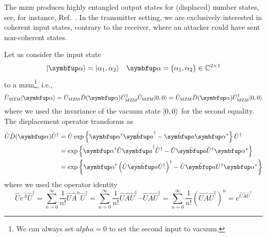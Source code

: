 The \gls{mzm} produces highly entangled output states for (displaced) number states, see, for instance, Ref.~\cite{Windhager2011}.
In the transmitter setting, we are exclusively interested in coherent input states, contrary to the receiver, where an attacker could have sent non-coherent states.

Let us consider the input state
\begin{align}
	\ket{\vb{\alpha}}
	&=
	\ket{\alpha_1,\alpha_2}
	&
	\vb{\alpha}
	=
	\begin{pmatrix}
		\alpha_1,
		\alpha_2
	\end{pmatrix}
	\in
	\mathbb{C}^{2\times1}
\end{align}
to a \gls{mzm}\footnote{We can always set $alpha=0$ to set the second input to vacuum.}, i.e.,
\begin{equation}
	\hat{U}_\text{MZM}
	\ket{\vb{\alpha}}
	=
	\hat{U}_\text{MZM}
	\hat{D}(\vb{\alpha})
	\hat{U}_\text{MZM}^\dagger
	\hat{U}_\text{MZM}
	\ket{0,0}
	=
	\hat{U}_\text{MZM}
	\hat{D}(\vb{\alpha})
	\hat{U}_\text{MZM}^\dagger
	\ket{0,0}
\end{equation}
where we used the invariance of the vacuum state $\lvert0,0\rangle$ for the second equality.
The displacement operator transforms as
\begin{equation}
	\begin{split}
		\hat{U}
		\hat{D}(\vb{\alpha})
		\hat{U}^\dagger
		&=
		\hat{U}
		\exp\left\{
			\vb{\alpha}^\trans
			\hat{\vb{a}}^\dagger
			-
			\hat{\vb{a}}
			\vb{\alpha}^*
		\right\}
		\hat{U}^\dagger
		\\
		&=
		\exp\left\{
			\vb{\alpha}^\trans
			\hat{U}
			\hat{\vb{a}}^\dagger
			\hat{U}^\dagger
			-
			\hat{U}
			\hat{\vb{a}}
			\hat{U}^\dagger
			\vb{\alpha}^*
		\right\}
		\\
		&=
		\exp\left\{
			\vb{\alpha}^\trans
			\left(
				\hat{U}
				\hat{\vb{a}}
				\hat{U}^\dagger
			\right)^\dagger
			-
			\hat{U}
			\hat{\vb{a}}
			\hat{U}^\dagger
			\vb{\alpha}^*
		\right\}
	\end{split}
\end{equation}
where we used the operator identity
\begin{equation}
	\hat{U}
	e^{\hat{A}}
	\hat{U}^\dagger
	=
	\sum_{n=0}^\infty
	\frac{1}{n!}
	\hat{U}
	\hat{A}^n
	\hat{U}^\dagger
	=
	\sum_{n=0}^\infty
	\frac{1}{n!}
	\hat{U}
	\hat{A}
	\hat{U}^\dagger
	\cdots
	\hat{U}
	\hat{A}
	\hat{U}^\dagger
	=
	\sum_{n=0}^\infty
	\frac{1}{n!}
	\left(
		\hat{U}
		\hat{A}
		\hat{U}^\dagger
	\right)^n
	=
	e^{\hat{U}\hat{A}\hat{U}^\dagger}
\end{equation}
